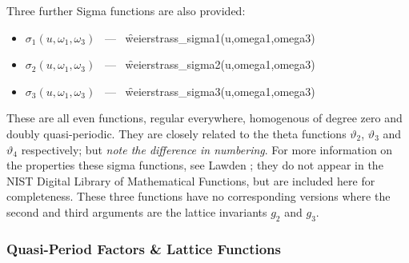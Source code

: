 Three further Sigma functions are also provided:
\begin{itemize}
\item $\sigma_1(u, \omega_1, \omega_3)$ \ --- \ \f{weierstrass\_sigma1(u,omega1,omega3)}
\item $\sigma_2(u, \omega_1, \omega_3)$ \ --- \ \f{weierstrass\_sigma2(u,omega1,omega3)}
\item $\sigma_3(u, \omega_1, \omega_3)$ \ --- \ \f{weierstrass\_sigma3(u,omega1,omega3)}
\end{itemize}
These are all even functions, regular everywhere, homogenous of degree zero and doubly quasi-periodic. They are closely related to the
theta functions $\vartheta_2$, $\vartheta_3$ and $\vartheta_4$ respectively; but \emph{note the difference in numbering}.
For more information on the properties these sigma functions, see Lawden \cite{Lawden:89};
they do not appear in the NIST Digital Library of Mathematical Functions, but are included here for completeness.
These three functions have no corresponding versions where the second and third
arguments are the lattice invariants $g_2$ and $g_3$.

\subsubsection{ Quasi-Period Factors \& Lattice Functions}
\hypertarget{ETA}{}
\hypertarget{operator:LATTICE_E1}{}
\hypertarget{operator:LATTICE_E2}{}
\hypertarget{operator:LATTICE_E3}{}
\hypertarget{operator:LATTICE_G}{}
\hypertarget{operator:LATTICE_DELTA}{}
\hypertarget{operator:LATTICE_G2}{}
\hypertarget{operator:LATTICE_G3}{}

